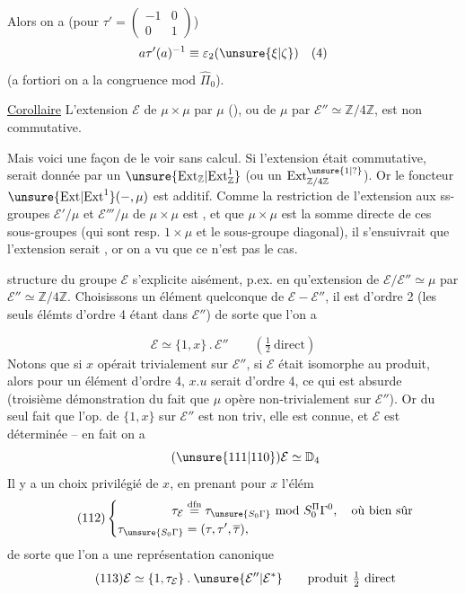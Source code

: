 
Alors on a (pour $\tau'=\begin{pmatrix}-1&0\\0&1\end{pmatrix}$)
\[
a\tau'(a)^{-1}\equiv\varepsilon_2(\unsure{\xi|\zeta})\quad(4)
\]
(a fortiori on a la congruence mod $\widehat{\Pi}_0$).

\uline{Corollaire} L'extension $\mathcal E$ de $\mu\times\mu$ par $\mu$
(), ou de $\mu$ par $\mathcal E''\simeq\mathbb Z/4\mathbb Z$, est non
commutative.
\margin{$\big|$}

Mais voici une façon de le voir sans calcul. Si l'extension était commutative,
  serait donnée par un
$\unsure{\mathrm{Ext}_{\mathbb Z}|\mathrm{Ext}^1_{\mathbb Z}}$
(ou un $\mathrm{Ext}^{\unsure{1|?}}_{\mathbb Z/4\mathbb Z}$).
Or le foncteur $\unsure{\mathrm{Ext}|\mathrm{Ext}^1}(-,\mu)$ est additif. Comme la restriction de
l'extension aux ss-groupes $\mathcal E'/\mu$ et $\mathcal E'''/\mu$ de
$\mu\times\mu$ est , et que $\mu\times\mu$ est
la somme directe de ces sous-groupes (qui sont resp. $1\times\mu$ et le
sous-groupe diagonal), il s'ensuivrait que l'extension serait
, or on a vu que ce n'est pas le cas.

  structure du groupe $\mathcal E$
s'explicite aisément, p.ex. en  qu'extension de
$\mathcal E/\mathcal E''\simeq\mu$ par
$\mathcal E''\simeq\mathbb Z/4\mathbb Z$. 
Choisissons un élément quelconque de $\mathcal E-\mathcal E''$, il est
d'ordre 2 (les seuls élémts d'ordre 4 étant dans $\mathcal E''$) de sorte
que l'on a


\[
\tag{110}
\mathcal E\simeq\{1,x\}\mathbin{.}\mathcal E''
\qquad\left(\tfrac12\ \text{direct}\right)
\]
Notons que si $x$ opérait trivialement sur $\mathcal E''$,
 si $\mathcal E$ était isomorphe au produit, alors pour un
élément  d'ordre 4,
$x.u$ serait d'ordre 4, ce qui est absurde (troisième démonstration du fait
que  $\mu$ opère non-trivialement
sur $\mathcal E''$). Or du seul fait que l'op. de $\{1,x\}$ sur
$\mathcal E''$ est non triv, elle est connue, et
 $\mathcal E$ est déterminée -- en fait on a
\[
\tag{\unsure{111|110}}
\mathcal E\simeq\mathbb D_4
\]
Il y a un choix privilégié de $x$, en prenant pour $x$ l'élém
\[
\tag{112}
\left\{\begin{aligned}
\tau_{\mathcal E}&\overset{\mathrm{dfn}}{=}
\tau_{\unsure{S_0\Gamma}}\ \mathrm{mod}\ S_0^{\Pi}\Gamma^0,
\quad\text{où bien sûr}\\
\tau_{\unsure{S_0\Gamma}}&=(\tau,\tau',\overline\tau),
\end{aligned}\right.
\]
de sorte que l'on a une représentation canonique
\[
\tag{113}
\mathcal E\simeq\{1,\tau_{\mathcal E}\}\mathbin{.}
\unsure{\mathcal E''|\mathcal E^*}
\qquad\text{produit }\tfrac12\text{ direct}
\]

